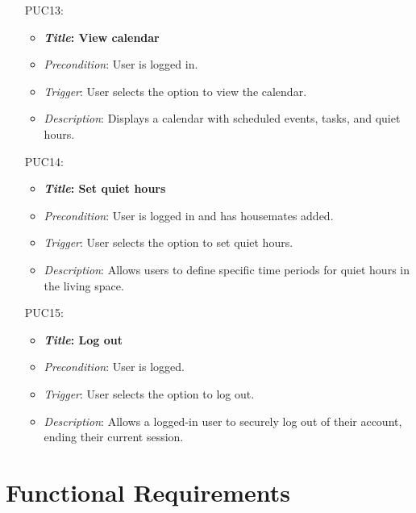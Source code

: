 \documentclass[12pt]{article}
\begin{document}
\begin{itemize}
    \item[PUC13:]
        \begin{itemize}
            \item \textbf{\textit{Title}: View calendar}
            \item \textit{Precondition}: User is logged in.
            \item \textit{Trigger}: User selects the option to view the calendar.
            \item \textit{Description}: Displays a calendar with scheduled events, tasks, and quiet hours.
    \end{itemize}

    \item[PUC14:]
        \begin{itemize}
            \item \textbf{\textit{Title}: Set quiet hours}
            \item \textit{Precondition}: User is logged in and has housemates added.
            \item \textit{Trigger}: User selects the option to set quiet hours.
            \item \textit{Description}: Allows users to define specific time periods for quiet hours in the living space.
    \end{itemize}

    \item[PUC15:]
        \begin{itemize}
            \item \textbf{\textit{Title}: Log out}
            \item \textit{Precondition}: User is logged.
            \item \textit{Trigger}: User selects the option to log out.
            \item \textit{Description}: Allows a logged-in user to securely log out of their account, ending their current session.
    \end{itemize}


\end{itemize}



\section{Functional Requirements}
\end{document}
